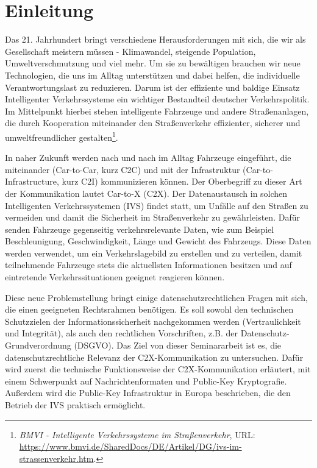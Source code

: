 
\section{Einleitung}
\label{ch:Introduction}


Das 21. Jahrhundert bringt verschiedene Herausforderungen mit sich, die wir als Gesellschaft meistern müssen - Klimawandel, steigende Population, Umweltverschmutzung und viel mehr. Um sie zu bewältigen brauchen wir neue Technologien, die uns im Alltag unterstützen und dabei helfen, die individuelle Verantwortungslast zu reduzieren. Darum ist der effiziente und baldige Einsatz Intelligenter Verkehrssysteme ein wichtiger Bestandteil deutscher Verkehrspolitik. Im Mittelpunkt hierbei stehen intelligente Fahrzeuge und andere Straßenanlagen, die durch Kooperation miteinander den Straßenverkehr effizienter, sicherer und umweltfreundlicher gestalten\footnote{\emph{BMVI - Intelligente Verkehrssysteme im Straßenverkehr}, URL: \url{https://www.bmvi.de/SharedDocs/DE/Artikel/DG/ivs-im-strassenverkehr.htm}.}. \nocite{BMVI}

In naher Zukunft werden nach und nach im Alltag Fahrzeuge eingeführt, die miteinander (Car-to-Car, kurz C2C) und mit der Infrastruktur (Car-to-Infrastructure, kurz C2I) kommunizieren können. Der Oberbegriff zu dieser Art der Kommunikation lautet Car-to-X (C2X). Der Datenaustausch in solchen Intelligenten Verkehrssystemen (IVS) findet statt, um Unfälle auf den Straßen zu vermeiden und damit die Sicherheit im Straßenverkehr zu gewährleisten. Dafür senden Fahrzeuge gegenseitig verkehrsrelevante Daten, wie zum Beispiel Beschleunigung, Geschwindigkeit, Länge und Gewicht des Fahrzeugs. Diese Daten werden verwendet, um ein Verkehrslagebild zu erstellen und zu verteilen, damit teilnehmende Fahrzeuge stets die aktuellsten Informationen besitzen und auf eintretende Verkehrssituationen geeignet reagieren können. 

Diese neue Problemstellung bringt einige datenschutzrechtlichen Fragen mit sich, die einen geeigneten Rechtsrahmen benötigen. Es soll sowohl den technischen Schutzzielen der Informationssicherheit nachgekommen werden (Vertraulichkeit und Integrität), als auch den rechtlichen Vorschriften, z.B. der Datenschutz-Grundverordnung (DSGVO). Das Ziel von dieser Seminararbeit ist es, die datenschutzrechtliche Relevanz der C2X-Kommunikation zu untersuchen. Dafür wird zuerst die technische Funktionsweise der C2X-Kommunikation erläutert, mit einem Schwerpunkt auf Nachrichtenformaten und Public-Key Kryptografie. Außerdem wird die Public-Key Infrastruktur in Europa beschrieben, die den Betrieb der IVS praktisch ermöglicht. 

